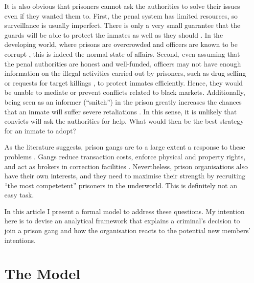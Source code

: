 \documentclass[a4paper,12pt]{article}
\begin{document}
It is also obvious that prisoners cannot ask the authorities to solve their issues even if they wanted them to. First, the penal system has limited resources, so surveillance is usually imperfect. There is only a very small guarantee that the guards will be able to protect the inmates as well as they should \citep[p. 20]{skarbek2014social}. In the developing world, where prisons are overcrowded and officers are known to be corrupt \citep[]{darke2013inmate, lemgruber2005brazilian, silveira2007realidade}, this is indeed the normal state of affairs. Second, even assuming that the penal authorities are honest and well-funded, officers may not have enough information on the illegal activities carried out by prisoners, such as drug selling or requests for target killings \citep[]{kauffman1988prison}, to protect inmates efficiently. Hence, they would be unable to mediate or prevent conflicts related to black markets. Additionally, being seen as an informer (``snitch'') in the prison greatly increases the chances that an inmate will suffer severe retaliations \citep[]{aakerstrom1986outcasts}. In this sense, it is unlikely that convicts will ask the authorities for help. What would then be the best strategy for an inmate to adopt?

As the literature suggests, prison gangs are to a large extent a response to these problems \citep[]{camp1985prison, fleisher2001overview}. Gangs reduce transaction costs, enforce physical and property rights, and act as brokers in correction facilities \citep{buentello1991prison, delisi2004gang, skarbek2011governance}. Nevertheless, prison organisations also have their own interests, and they need to maximise their strength by recruiting ``the most competetent'' prisoners in the underworld. This is definitely not an easy task. 

In this article I present a formal model to address these questions. My intention here is to devise an analytical framework that explains a criminal's decision to join a prison gang and how the organisation reacts to the potential new members' intentions.

\section{The Model}
\end{document}

